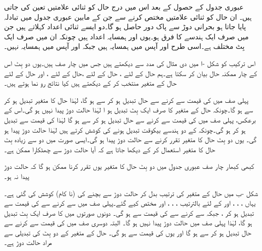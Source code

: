 عبوری جدول کے حصول کے بعد اس میں درج حال کو ثنائی علامتیں تعین کی جاتی ہیں۔ ان حال کو  ثنائی علامتیں مختص کرنے سے جن کے مابین عبوری جدول میں تبادلہ پایا جاتا ہو بحرانی دوڑ سے پاک دور حاصل ہو گا۔دو ایسے ثنائی اعداد  کہلاتے ہیں جن میں صرف ایک ہندسے کا فرق ہو۔یوں  اور  ہمسایہ اعداد ہیں چونکہ ان میں صرف ایک بِٹ مختلف ہے۔اسی طرح  اور  آپس میں ہمسایہ ہیں جبکہ  اور  آپس میں ہمسایہ نہیں۔

اس ترکیب کو شکل -ا میں دی مثال کی مدد سے دیکھتے ہیں جس میں چار صف ہیں۔یوں دو بِٹ  اس کے چار ممکنہ حال بیان کر سکتا ہے۔ہم حال  کے لئے ، حال  کے لئے ،حال  کے لئے ، اور حال  کے لئے  حال کے متغیر منتخب کر کے دیکھتے ہیں کیا نتائج رو نما ہوتے ہیں۔

 پہلی صف میں  کی قیمت  سے  کرنے سے حال تبدیل ہو کر سے  ہو گا، لہٰذا حال کا متغیر  تبدیل ہو کر  سے  ہو گا۔چونکہ حال کے متغیر کا صرف ایک بِٹ تبدیل ہو ا لہٰذا حالت دوڑ پیدا نہیں ہو گی۔اس کے برعکس، پہلی صف میں  کی قیمت  سے  کرنے سے حال تبدیل ہو کر  سے  ہو گا لہٰذا  کی قیمت  سے تبدیل ہو کر  ہو گی۔چونکہ  کے دو ہندسے بیکوقت تبدیل ہونے کی کوشش کرتے ہیں لہٰذا حالت دوڑ پیدا ہو گی۔ یوں دو بِٹ حال کا متغیر تقرر کرنے سے حالت دوڑ پیدا ہو گی۔ایسی صورت میں دو سے زیادہ بِٹ حال کا متغیر استعمال کر کے دیکھا جاتا ہے کہ آیا حالت دوڑ سے چھٹکارا ممکن ہے۔

کبھی کبھار چار صف عبوری جدول میں دو بِٹ حال کا متغیر یوں تقرر کرنا ممکن ہو گا کہ حالت دوڑ پیدا نہ ہو۔

شکل  -ب میں حال کے متغیر کی ترتیب بدل کر حالت دوڑ سے بچنے کی (نا کام) کوشش کی گئی ہے۔ یہاں ، ، ، اور  کے لئے بالترتیب ، ، ، اور  مختص کیے گئے۔پہلی صف میں سے  کرنے سے  کی قیمت  سے تبدیل ہو کر  ، جبکہ  سے  کرنے سے  کی قیمت  سے  ہو گی۔ دونوں صورتوں میں  کا صرف ایک بِٹ تبدیل ہو گا، لہٰذا پہلی صف میں حالت دوڑ پیدا نہیں ہو گا۔ البتہ دوسری صف میں  کی قیمت  سے  کرنے سے حال تبدیل ہو کر  سے  ہو گا اور یوں  کی قیمت  سے  ہو گی۔ حال کے متغیر کے دو بِٹ کی تبدیلی سے مراد حالت دوڑ ہے۔

